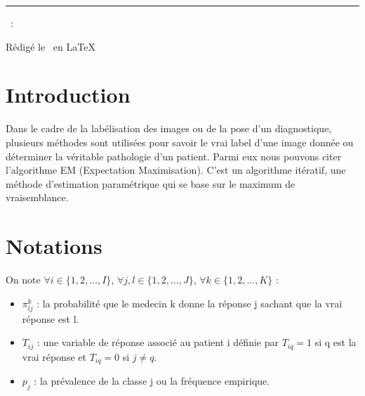 \documentclass[a4paper,french,10pt]{article}
\begin{document}
	
	\title{\vspace{-1in}} %
	\author{} %
	\date{} %
	\maketitle %
	
	\usebox{\myReportTitle}
	\vspace{1in} %
	
	{\centering \huge \assignmentName \par}
	{\centering \noindent\rule{4in}{0.1pt} \par}
	\vspace{0.05in}
	{\centering \courseCode~: \courseName~ \par}
	{\centering Rédigé le \pubDate\ en \LaTeX \par}
	\vspace{1in}
	
	\tableofcontents
	\newpage

	
	\section{Introduction}
	
	Dans le cadre de la labélisation des images ou de la pose d'un diagnostique, plusieurs méthodes sont utilisées pour savoir le vrai label d’une image donnée ou déterminer la véritable pathologie d'un patient. Parmi eux nous pouvons citer l’algorithme EM (Expectation Maximisation). C’est un algorithme itératif, une méthode d’estimation paramétrique qui se base sur le maximum de vraisemblance.
	
	\section{Notations}
	
	On note $\forall i \in \{1, 2, \dots,I\}$, $\forall j, l \in \{1, 2, \dots,J\}$, $\forall k \in \{1, 2, \dots,K\}$ : \\
	
	\begin{itemize}
		\item $\pi_{lj}^k$ : la probabilité que le medecin k donne la réponse j sachant que la vrai réponse est l.
		\item $T_{ij}$ : une variable de réponse associé au patient i définie par $T_{iq} = 1$  si q est la vrai réponse et $T_{iq} = 0$ si $j \neq q$.
		\item $p_j$ : la prévalence de la classe j ou la fréquence empirique.
		
	\end{itemize}
	
\end{document}
